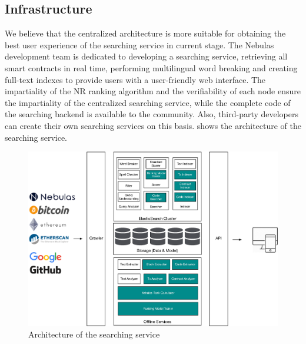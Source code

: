 \subsection{Infrastructure}

We believe that the centralized architecture is more suitable for obtaining the best user experience of the searching service in current stage. The Nebulas development team is dedicated to developing a searching service, retrieving all smart contracts in real time, performing multilingual word breaking and creating full-text indexes to provide users with a user-friendly web interface. The impartiality of the NR ranking algorithm and the verifiability of each node ensure the impartiality of the centralized searching service, while the complete code of the searching backend is available to the community. Also, third-party developers can create their own searching services on this basis.  shows the architecture of the searching service.


\begin{figure}[h]
\centering
\includegraphics[width=16cm]{./figs/search-arch-new}
\caption{Architecture of the searching service}
\label{fig:search-arch}
\end{figure}

